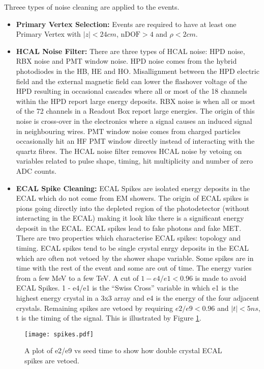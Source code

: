 Threee types of noise cleaning are applied to the events. 
\begin{itemize}
\item {\bf Primary Vertex Selection:} Events are required to have at least one
Primary Vertex with $|z| < 24\unit{cm}$, $\mbox{nDOF} > 4$ and $\rho <
2\unit{cm}$.
\item {\bf HCAL Noise Filter:} There are three types of HCAL noise: HPD noise, 
RBX noise and PMT window noise. HPD noise comes from the hybrid photodiodes in
the HB, HE and HO. Misallignment between the HPD electric field and the external
magnetic field can lower the flashover voltage of the HPD resulting in 
occasional cascades where all or most of the 18 channels within the HPD report
large energy deposits. RBX noise is when all or most of the 72 channels in a
Readout Box report large energies. The origin of this noise is cross-over in the
electronics where a signal causes an induced signal in neighbouring wires.
PMT window noise comes from charged particles occasionally hit an HF PMT window 
directly instead of interacting with the quartz fibres. The HCAL noise filter 
removes HCAL noise by vetoing on variables related to pulse shape, timing, hit 
multiplicity and number of zero ADC counts.
\item {\bf ECAL Spike Cleaning:} ECAL Spikes are isolated energy deposits in 
the ECAL which do not come from EM showers. The origin of ECAL spikes is pions
going directly into the depleted region of the photodetector (without
interacting in the ECAL) making it look like there is a significant energy 
deposit in the ECAL. ECAL spikes lead to fake photons and fake MET. There are 
two properties which characterise ECAL spikes: topology and timing. ECAL spikes 
tend to be single crystal enrgy deposits in the ECAL which are often not vetoed 
by the shower shape variable. Some spikes are in time with the rest of the event 
and some are out of time. The energy varies from a few MeV to a few TeV. A 
cut of $1 - e4/e1 < 0.96$ is made to avoid ECAL Spikes. 1 - e4/e1 is the ``Swiss 
Cross'' variable in which e1 is the highest energy crystal in a 3x3 array and e4 
is the energy of the four adjacent crystals. Remaining spikes are vetoed by
requiring $e2/e9 < 0.96$ and $|t| < 5\unit{ns}$, t is the timing of the signal. 
This is illustrated by Figure \ref{fig:spikes}.
\end{itemize}

\begin{figure}
\begin{center}
\texttt{[image: spikes.pdf]}
\end{center}
\caption{A plot of e2/e9 vs seed time to show how double crystal ECAL spikes are
vetoed.}
\label{fig:spikes}
\end{figure}

